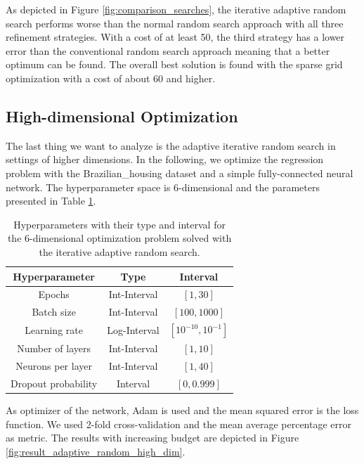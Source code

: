 As depicted in Figure \ref{fig:comparison_searches}, the iterative adaptive random search performs worse than the normal random search approach with all three refinement strategies. With a cost of at least 50, the third strategy has a lower error than the conventional random search approach meaning that a better optimum can be found. The overall best solution is found with the sparse grid optimization with a cost of about 60 and higher.


\subsection{High-dimensional Optimization}

The last thing we want to analyze is the adaptive iterative random search in settings of higher dimensions. In the following, we optimize the regression problem with the Brazilian\_housing dataset and a simple fully-connected neural network. The hyperparameter space is 6-dimensional and the parameters presented in Table \ref{tab:hyperparameter_space_adaptive_random_search}.

\begin{table}[H]
	\caption{ Hyperparameters with their type and interval for the 6-dimensional optimization problem solved with the iterative adaptive random search. }
	\label{tab:hyperparameter_space_adaptive_random_search}
	\centering
	\begin{tabular}{| c c c |} 
		\hline
		Hyperparameter & Type & Interval \\ 
		\hline
		Epochs & Int-Interval & $ [1,30] $ \\ 
		Batch size & Int-Interval & $ [100,1000] $ \\ 
		Learning rate & Log-Interval & $ [10^{-10},10^{-1}] $ \\ 
		Number of layers & Int-Interval & $ [1,10] $ \\ 
		Neurons per layer & Int-Interval & $ [1,40] $ \\ 
		Dropout probability & Interval & $ [0,0.999] $ \\ 
		\hline
	\end{tabular}
\end{table}

As optimizer of the network, Adam is used and the mean squared error is the loss function. We used 2-fold cross-validation and the mean average percentage error as metric. The results with increasing budget are depicted in Figure \ref{fig:result_adaptive_random_high_dim}.

